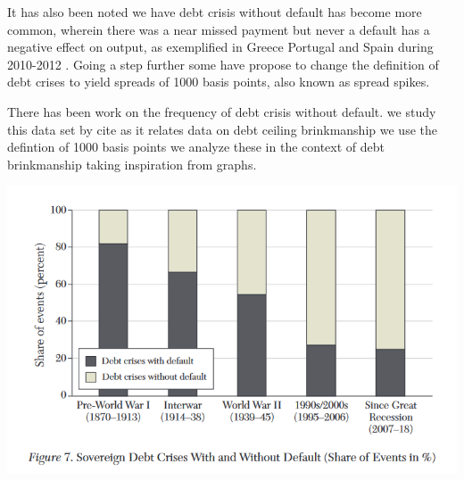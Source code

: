 \documentclass[
  12pt]{article}
\begin{document}
It has also been noted we have debt crisis without default has become
more common, wherein there was a near missed payment but never a default
has a negative effect on output, as exemplified in Greece Portugal and
Spain during 2010-2012 \citet{mitchener2023} . Going a step further some
have propose to change the definition of debt crises to yield spreads of
1000 basis points, also known as spread spikes.
\citep{broner2013, aguiar, krishnamurthy}

There has been work on the frequency of debt crisis without default. we
study this data set by cite \citet{meyer2022} as it relates data on debt
ceiling brinkmanship \citet{reinhart2008} we use the defintion of 1000
basis points we analyze these in the context of debt brinkmanship taking
inspiration from graphs.

\includegraphics{style-guide/overtime_brink_1.png}
\end{document}
